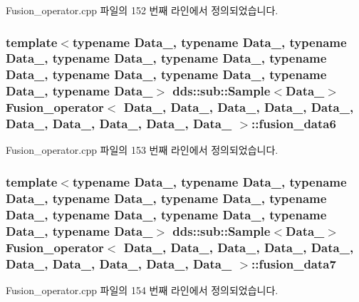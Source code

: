 Fusion\+\_\+operator.\+cpp 파일의 152 번째 라인에서 정의되었습니다.

\subsubsection[{\texorpdfstring{fusion\+\_\+data6}{fusion_data6}}]{\setlength{\rightskip}{0pt plus 5cm}template$<$typename Data\+\_, typename Data\+\_, typename Data\+\_, typename Data\+\_, typename Data\+\_, typename Data\+\_, typename Data\+\_, typename Data\+\_, typename Data\+\_, typename Data\+\_$>$ dds\+::sub\+::\+Sample$<$Data\+\_$>$ {\bf Fusion\+\_\+operator}$<$ Data\+\_, Data\+\_, Data\+\_, Data\+\_, Data\+\_, Data\+\_, Data\+\_, Data\+\_, Data\+\_, Data\+\_ $>$\+::fusion\+\_\+data6}\hypertarget{classFusion__operator_ab60db5c3be3d0512a35c4231616383c4}{}\label{classFusion__operator_ab60db5c3be3d0512a35c4231616383c4}


Fusion\+\_\+operator.\+cpp 파일의 153 번째 라인에서 정의되었습니다.

\subsubsection[{\texorpdfstring{fusion\+\_\+data7}{fusion_data7}}]{\setlength{\rightskip}{0pt plus 5cm}template$<$typename Data\+\_, typename Data\+\_, typename Data\+\_, typename Data\+\_, typename Data\+\_, typename Data\+\_, typename Data\+\_, typename Data\+\_, typename Data\+\_, typename Data\+\_$>$ dds\+::sub\+::\+Sample$<$Data\+\_$>$ {\bf Fusion\+\_\+operator}$<$ Data\+\_, Data\+\_, Data\+\_, Data\+\_, Data\+\_, Data\+\_, Data\+\_, Data\+\_, Data\+\_, Data\+\_ $>$\+::fusion\+\_\+data7}\hypertarget{classFusion__operator_a12845b96c8a2a00cbf7290462e2fa215}{}\label{classFusion__operator_a12845b96c8a2a00cbf7290462e2fa215}


Fusion\+\_\+operator.\+cpp 파일의 154 번째 라인에서 정의되었습니다.

